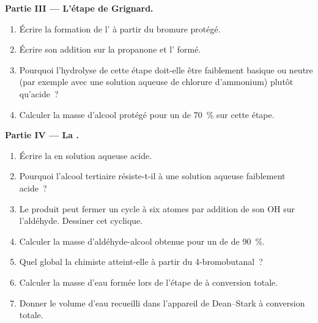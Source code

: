 \begin{problem}
\medskip
\noindent\textbf{Partie III --- L'étape de Grignard.}
\begin{enumerate}[resume]
  \item Écrire la formation de l' à partir du bromure
        protégé.
  \item Écrire son addition sur la propanone et l' formé.
  \item Pourquoi l'hydrolyse de cette étape doit-elle être faiblement
        basique ou neutre (par exemple avec une solution aqueuse de
        chlorure d'ammonium) plutôt qu'acide~?
  \item Calculer la masse d'alcool protégé pour un  de
        \qty{70}{\percent} sur cette étape.
\end{enumerate}

\medskip
\noindent\textbf{Partie IV --- La .}
\begin{enumerate}[resume]
  \item Écrire la  en solution aqueuse acide.
  \item Pourquoi l'alcool tertiaire résiste-t-il à une solution aqueuse
        faiblement acide~?
  \item Le produit peut fermer un cycle à six atomes par addition de son
        OH sur l'aldéhyde. Dessiner cet  cyclique.
  \item Calculer la masse d'aldéhyde-alcool obtenue pour un  de
         de \qty{90}{\percent}.
  \item Quel  global la chimiste atteint-elle à partir du
        4-bromobutanal~?
  \item Calculer la masse d'eau formée lors de l'étape de  à
        conversion totale.
  \item Donner le volume d'eau recueilli dans l'appareil de Dean--Stark à
        conversion totale.
\end{enumerate}
\end{problem}
